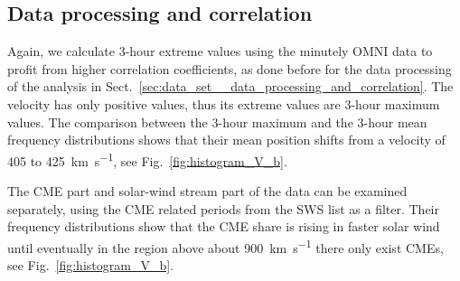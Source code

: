
\subsection{Data processing and correlation}
Again, we calculate 3-hour extreme values using the minutely OMNI data to profit from higher correlation coefficients, as done before for the data processing of the \vBz{} analysis in Sect.~\ref{sec:data_set__data_processing_and_correlation}. The velocity has only positive values, thus its extreme values are 3-hour maximum values. The comparison between the 3-hour maximum and the 3-hour mean frequency distributions shows that their mean position shifts from a velocity of 405 to \SI{425}{\km\per\s}, see Fig.~\ref{fig:histogram_V_b}.
\begin{figure}
\end{figure}
The CME part and solar-wind stream part of the data can be examined separately, using the CME related periods from the SWS list as a filter. Their frequency distributions show that the CME share is rising in faster solar wind until eventually in the region above about \SI{900}{\km\per\s} there only exist CMEs, see Fig.~\ref{fig:histogram_V_b}.

